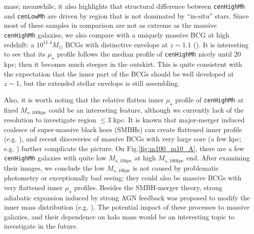 \documentclass{emulateapj}
\def\rbcg{\texttt{cenHighMh}}
\def\nbcg{\texttt{cenLowMh}}
\def\minn{{$M_{\star,10\mathrm{kpc}}$}}
\def\mtot{{$M_{\star,100\mathrm{kpc}}$}}
\def\mden{{$\mu_{\star}$}}
\begin{document}
\begin{CJK*}{UTF8}{gbsn}
    mass; meanwhile, it also highlights that structural difference between \rbcg{} and 
    \nbcg{} are driven by region that is not dominated by ``in-situ'' stars. 
    Since most of these samples in comparison are not as extreme as the massive 
    \rbcg{} galaxies, we also compare with a uniquely massive BCG at high redshift: 
    a $10^{11.4} M_{\odot}$ BCGs with distinctive envelope at $z\sim 1.1$ 
    (\citealt{Liu2013}).  
    It is interesting to see that its \mden{} profile follows the median profile of 
    \rbcg{} nicely until 20 kpc; then it becomes much steeper in the outskirt.  
    This is quite consistent with the expectation that the inner part of the BCGs 
    should be well developed at $z\sim 1$, but the extended stellar envelope is still 
    assembling.  
    
    Also, it is worth noting that the relative flatten inner \mden{} profile of \rbcg{}
    at fixed \mtot{} could be an interesting feature, although we currently lack of the 
    resolution to investigate region $\leq 3$ kpc.  
    It is known that major-merger induced coalesce of super-massive black hoes (SMBHs)
    can create flattened inner profile (e.g. \citealt{Milosavljvi2002}), and recent 
    discoveries of massive BCGs with very large core 
    (a few kpc; e.g. \citealt{Postman2012, LopezCruz2014}) further complicate the picture.
    On Fig.\ref{fig:m100_m10_A}, there are a few \rbcg{} galaxies with quite low 
    \minn{} at high \mtot{} end. 
    After examining their images, we conclude the low \minn{} is not caused by problematic
    photometry or exceptionally bad seeing; they could also be massive BCGs with very 
    flattened inner \mden{} profiles.  
    Besides the SMBH-merger theory, strong adiabatic expansion induced by strong AGN 
    feedback was proposed to modify the inner mass distribution (e.g. \citealt{Fan2008}). 
    The potential impact of these processes to massive galaxies, and their dependence on 
    halo mass would be an interesting topic to investigate in the future.  


\end{CJK*}
\end{document}
